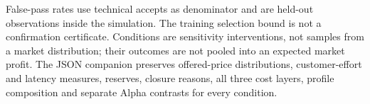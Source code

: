 \par\smallskip False-pass rates use technical accepts as denominator and are held-out observations inside the simulation. The training selection bound is not a confirmation certificate. Conditions are sensitivity interventions, not samples from a market distribution; their outcomes are not pooled into an expected market profit. The JSON companion preserves offered-price distributions, customer-effort and latency measures, reserves, closure reasons, all three cost layers, profile composition and separate Alpha contrasts for every condition.
